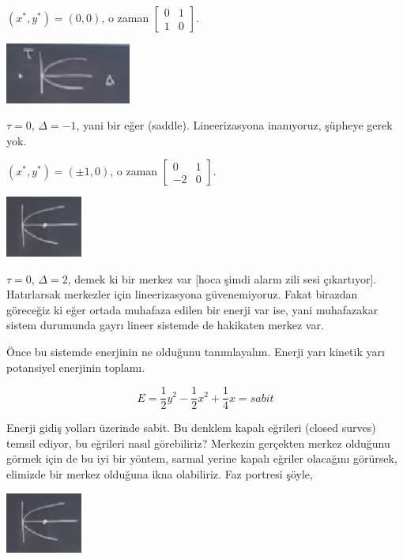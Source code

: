 \documentclass[12pt,fleqn]{article}\usepackage{../../common}
\begin{document}
$(x^\ast,y^\ast) = (0,0)$, o zaman $\left[\begin{array}{rr} 0 & 1 \\ 1 & 0\end{array}\right]$.

\includegraphics[height=2cm]{07_02.png}

$\tau=0$, $\Delta = -1$, yani bir eğer (saddle). Lineerizasyona inanıyoruz,
şüpheye gerek yok.

$(x^\ast,y^\ast) = (\pm 1,0)$, o zaman $\left[\begin{array}{rr} 0 & 1 \\ -2 & 0\end{array}\right]$.

\includegraphics[height=2cm]{07_03.png}

$\tau=0$, $\Delta = 2$, demek ki bir merkez var [hoca şimdi alarm zili sesi
çıkartıyor]. Hatırlarsak merkezler için lineerizasyona güvenemiyoruz. Fakat
birazdan göreceğiz ki eğer ortada muhafaza edilen bir enerji var ise, yani
muhafazakar sistem durumunda gayrı lineer sistemde de hakikaten merkez var.

Önce bu sistemde enerjinin ne olduğunu tanımlayalım. Enerji yarı kinetik yarı
potansiyel enerjinin toplamı. 

$$ E = \frac{1}{2}y^2 - \frac{1}{2}x^2 + \frac{1}{4}x = sabit $$

Enerji gidiş yolları üzerinde sabit. Bu denklem kapalı eğrileri (closed surves)
temsil ediyor, bu eğrileri nasıl görebiliriz? Merkezin gerçekten merkez olduğunu
görmek için de bu iyi bir yöntem, sarmal yerine kapalı eğriler olacağını
görürsek, elimizde bir merkez olduğuna ikna olabiliriz. Faz portresi şöyle,

\includegraphics[height=2cm]{07_03.png}
\end{document}
